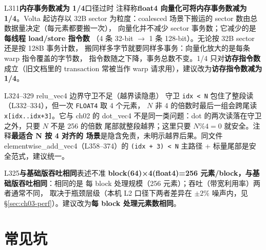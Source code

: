 \begin{kaogu}[F1]{L311\textbf{内存事务数减为 1/4}口径过时}
注释称\textbf{float4 向量化可将内存事务数减为 1/4}。Volta 起访存以 32B sector
为粒度：coalesced 场景下搬运的 sector 数由总数据量决定（每元素都要搬一次），
向量化并不减少 sector 事务数；它减少的是\textbf{每线程 load/store 指令数}
（4 条 32-bit $\to$ 1 条 128-bit）。无论按 32B sector 还是按 128B 事务计数，
搬同样多字节就要同样多事务：向量化放大的是每条 warp 指令覆盖的字节数，
指令数随之下降，事务总数不变。1/4 只对\textbf{访存指令数}成立（旧文档里的
transaction 常被当作 warp 请求用），建议改为\textbf{访存指令数减为 1/4}。
\end{kaogu}

\begin{kaogu}[F1]{L324--329 relu\_vec4 边界守卫不足（越界读隐患）}
守卫 \texttt{idx < N} 包住了整段读（L332--334），但一次 \texttt{FLOAT4} 取 4 个元素，
$N$ 非 4 的倍数时最后一组会跨尾读 \texttt{x[idx.\allowbreak{}.\allowbreak{}idx+3]}。它与 ch02 的
dot\_vec4 不是同一类问题：dot 的两次读落在守卫之外，只要 $N$ 不是 256 的倍数
尾部就整段越界；这里只要 $N \% 4 = 0$ 就安全。注释\textbf{最适合 N 按 4 对齐的
场景}是隐含免责，未明示越界后果。同文件 elementwise\_add\_vec4（L358--374）的
\texttt{(idx + 3) < N} 主路径 + 标量尾部是安全范式，建议统一。
\end{kaogu}

\begin{kaogu}[F4]{L325\textbf{与基础版吞吐相同}表述不准}
\textbf{block(64)×4(float4)=256 元素/block，与基础版吞吐相同}：相同的是
每 block 处理规模（256 元素）；吞吐（带宽利用率）两者通常不同，
取决于瓶颈层级（本机 L2 口径下两者差异在 $\pm 2\%$ 噪声内，见
\S\ref{sec:ch03-perf}）。建议改为\textbf{每 block 处理元素数相同}。
\end{kaogu}

\section{常见坑}

